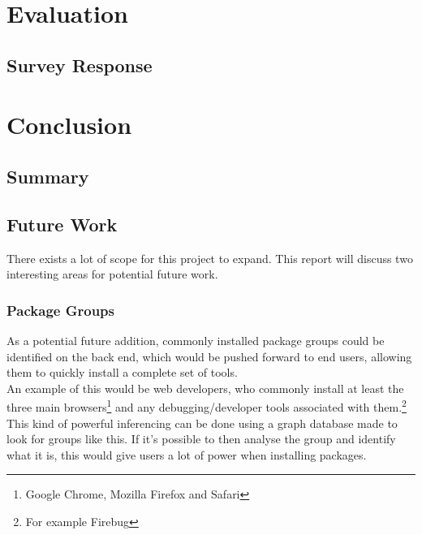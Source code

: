 \documentclass{l4proj}
\begin{document}
 
\chapter{Evaluation}
\section{Survey Response}
 
 
\chapter{Conclusion}

\section{Summary}
\section{Future Work}
There exists a lot of scope for this project to expand. This report will discuss two interesting areas for potential future work.

\subsection{Package Groups}
As a potential future addition, commonly installed package groups could be identified on the back end, which would be pushed forward to end users, allowing them to quickly install a complete set of tools.\\
An example of this would be web developers, who commonly install at least the three main browsers\footnote{Google Chrome, Mozilla Firefox and Safari} and any debugging/developer tools associated with them.\footnote{For example Firebug}\\
This kind of powerful inferencing can be done using a graph database made to look for groups like this. If it's possible to then analyse the group and identify what it is, this would give users a lot of power when installing packages.  
\end{document}
